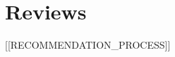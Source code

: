 \documentclass[a4paper]{article}
\begin{document}
\beginingpreprint

\begin{center}\Large\bfseries
    \section*{Reviews}
\end{center}

[[RECOMMENDATION_PROCESS]]
\end{document}

